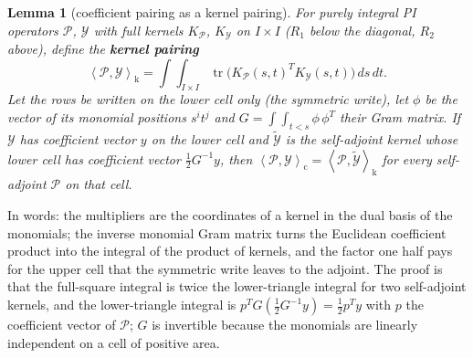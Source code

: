 \documentclass[12pt]{article}
\newcommand{\mcl}[1]{\mathcal{#1}}
\newcommand{\mrm}[1]{\mathrm{#1}}
\newcommand{\ip}[2]{\left\langle #1,#2\right\rangle}
\newcommand{\ipc}[2]{\left\langle #1,#2\right\rangle_{\mrm{c}}}
\DeclareMathOperator{\tr}{tr}
\theoremstyle{plain}
\newtheorem{lemma}[theorem]{Lemma}
\theoremstyle{definition}
\theoremstyle{remark}
\begin{document}
\begin{lemma}[coefficient pairing as a kernel pairing]\label{lem:gram}
For purely integral PI operators $\mcl P$, $\mcl Y$ with full kernels $K_{\mcl P}$, $K_{\mcl Y}$ on $I\times I$ ($R_1$ below the diagonal, $R_2$ above), define the \textbf{kernel pairing}
\[
\ip{\mcl P}{\mcl Y}_{\mrm k}=\int\!\!\int_{I\times I}\tr\bigl(K_{\mcl P}(s,t)^TK_{\mcl Y}(s,t)\bigr)\,ds\,dt .
\]
Let the rows be written on the lower cell only (the symmetric write), let $\phi$ be the vector of its monomial positions $s^it^j$ and $G=\int\!\!\int_{t<s}\phi\,\phi^T$ their Gram matrix. If $\mcl Y$ has coefficient vector $y$ on the lower cell and $\widetilde{\mcl Y}$ is the self-adjoint kernel whose lower cell has coefficient vector $\tfrac12G^{-1}y$, then $\ipc{\mcl P}{\mcl Y}=\ip{\mcl P}{\widetilde{\mcl Y}}_{\mrm k}$ for every self-adjoint $\mcl P$ on that cell.
\end{lemma}
In words: the multipliers are the coordinates of a kernel in the dual basis of the monomials; the inverse monomial Gram matrix turns the Euclidean coefficient product into the integral of the product of kernels, and the factor one half pays for the upper cell that the symmetric write leaves to the adjoint. The proof is that the full-square integral is twice the lower-triangle integral for two self-adjoint kernels, and the lower-triangle integral is $p^TG(\tfrac12G^{-1}y)=\tfrac12p^Ty$ with $p$ the coefficient vector of $\mcl P$; $G$ is invertible because the monomials are linearly independent on a cell of positive area.
\end{document}
